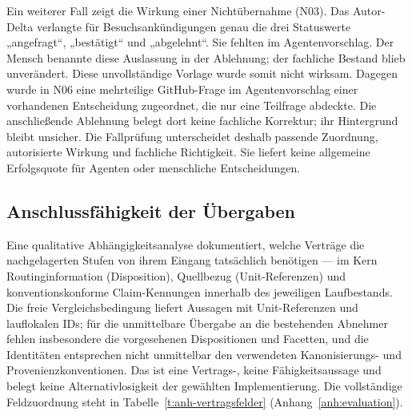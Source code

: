 Ein weiterer Fall zeigt die Wirkung einer Nichtübernahme (N03).
Das Autor-Delta verlangte für Besuchsankündigungen genau die drei
Statuswerte „angefragt``, „bestätigt`` und „abgelehnt``. Sie fehlten
im Agentenvorschlag. Der Mensch benannte diese Auslassung in der
Ablehnung; der fachliche Bestand blieb unverändert. Diese
unvollständige Vorlage wurde somit nicht wirksam. Dagegen wurde
in N06 eine mehrteilige GitHub-Frage im Agentenvorschlag einer
vorhandenen Entscheidung zugeordnet, die nur eine Teilfrage abdeckte. Die anschließende
Ablehnung belegt dort keine fachliche Korrektur; ihr Hintergrund
bleibt unsicher. Die Fallprüfung unterscheidet deshalb passende
Zuordnung, autorisierte Wirkung und fachliche Richtigkeit. Sie
liefert keine allgemeine Erfolgsquote für Agenten oder menschliche
Entscheidungen.

\subsection{Anschlussfähigkeit der Übergaben}
\label{sec:eval-anschluss}

Eine qualitative Abhängigkeitsanalyse dokumentiert, welche
Verträge die nachgelagerten Stufen von ihrem Eingang tatsächlich
benötigen --- im Kern Routinginformation (Disposition),
Quellbezug (Unit-Referenzen) und konventionskonforme Claim-Kennungen
innerhalb des jeweiligen Laufbestands. Die freie
Vergleichsbedingung liefert Aussagen mit Unit-Referenzen und
lauflokalen IDs; für die unmittelbare Übergabe an die bestehenden
Abnehmer fehlen insbesondere die vorgesehenen Dispositionen und
Facetten, und die Identitäten entsprechen nicht unmittelbar den
verwendeten Kanonisierungs- und Provenienzkonventionen. Das ist
eine Vertrags-, keine Fähigkeitsaussage und belegt keine
Alternativlosigkeit der gewählten Implementierung. Die
vollständige Feldzuordnung steht in
Tabelle~\ref{t:anh-vertragsfelder}
(Anhang~\ref{anh:evaluation}).
